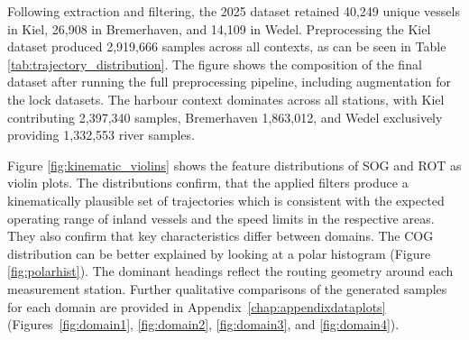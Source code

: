 Following extraction and filtering, the 2025 dataset retained 40,249 unique vessels in Kiel, 26,908 in Bremerhaven, and 14,109 in Wedel. Preprocessing the Kiel dataset produced 2,919,666 samples across all contexts, as can be seen in Table \ref{tab:trajectory_distribution}.
The figure shows the composition of the final dataset after running the full preprocessing pipeline, including augmentation for the lock datasets.
The harbour context dominates across all stations, with Kiel contributing 2,397,340 samples, Bremerhaven 1,863,012, and Wedel exclusively providing 1,332,553 river samples.%

Figure \ref{fig:kinematic_violins} shows the feature distributions of \ac{SOG} and \ac{ROT} as violin plots. The distributions confirm, that the applied filters produce a kinematically plausible set of trajectories which is consistent with the expected operating range of inland vessels and the speed limits in the respective areas. They also confirm that key characteristics differ between domains.
The \ac{COG} distribution can be better explained by looking at a polar histogram (Figure \ref{fig:polarhist}).
The dominant headings reflect the routing geometry around each measurement station. %
Further qualitative comparisons of the generated samples for each domain are provided in Appendix~\ref{chap:appendixdataplots} (Figures~\ref{fig:domain1}, \ref{fig:domain2}, \ref{fig:domain3}, and \ref{fig:domain4}).


